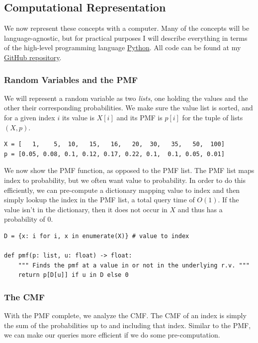 \documentclass[11pt, oneside]{article}
\theoremstyle{plain}
\theoremstyle{definition}
\begin{document}
\subsection{Computational Representation} \label{subsec:computer}
We now represent these concepts with a computer. Many of the concepts
will be language-agnostic, but for practical purposes I will
describe everything in terms of the high-level programming language
\href{https://www.python.org/}{Python}. All code can be found at my
\href{https://github.com/stephen-huan/probabilistic-rolling}
{GitHub repository}.

\subsubsection{Random Variables and the PMF}
We will represent a random variable as two \textit{lists}, one holding
the values and the other their corresponding probabilities. We make sure
the value list is sorted, and for a given index \( i \) its value is
\( X[i] \) and its PMF is \( p[i] \) for the tuple of lists \( (X, p) \).
\begin{verbatim}
X = [   1,    5,  10,   15,   16,   20,  30,   35,   50,  100]
p = [0.05, 0.08, 0.1, 0.12, 0.17, 0.22, 0.1,  0.1, 0.05, 0.01]
\end{verbatim}

We now show the PMF function, as opposed to the PMF list. The PMF list maps
index to probability, but we often want value to probability. In order to do
this efficiently, we can pre-compute a dictionary mapping value to index and
then simply lookup the index in the PMF list, a total query time of \( O(1) \).
If the value isn't in the dictionary, then it does not occur in \( X \) and
thus has a probability of 0.
\begin{verbatim}
D = {x: i for i, x in enumerate(X)} # value to index

def pmf(p: list, u: float) -> float:
    """ Finds the pmf at a value in or not in the underlying r.v. """
    return p[D[u]] if u in D else 0
\end{verbatim}

\subsubsection{The CMF}

With the PMF complete, we analyze the CMF. The CMF of an index is simply the
sum of the probabilities up to and including that index. Similar to the PMF,
we can make our queries more efficient if we do some pre-computation. 
\end{document}
